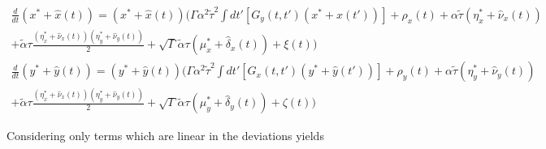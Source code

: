 \documentclass{article}
\begin{document}
\begin{equation}
	\begin{split}
		\frac{d}{dt} (x^* + \hat{x}(t)) = (x^* + \hat{x}(t))(\Gamma \alpha^2 \tilde{\tau}^2 \int dt'
		[G_y(t, t')(x^* + \hat{x}(t'))] + \rho_x(t) + \alpha \tilde{\tau} (\eta_x^* + \hat{\nu}_x
		(t)) \\ + \tilde{\alpha} \tau \frac{(\eta_x^* + \hat{\nu}_x(t)) (\eta_y^* + \hat{\nu}_y(t))}
		{2} + \sqrt{\Gamma} \tilde{\alpha} \tau (\mu_x^* + \hat{\delta}_x(t)) + \xi(t)) \\
		\frac{d}{dt} (y^* + \hat{y}(t)) = (y^* + \hat{y}(t))(\Gamma \alpha^2 \tilde{\tau}^2 \int dt'
		[G_x(t, t')(y^* + \hat{y}(t'))] + \rho_y(t) + \alpha \tilde{\tau} (\eta_y^* + \hat{\nu}_y
		(t)) \\ + \tilde{\alpha} \tau \frac{(\eta_x^* + \hat{\nu}_x(t)) (\eta_y^* + \hat{\nu}_y(t))}
		{2} + \sqrt{\Gamma} \tilde{\alpha} \tau (\mu_y^* + \hat{\delta}_y(t)) + \zeta(t))
	\end{split}
\end{equation}

Considering only terms which are linear in the deviations yields



\end{document}
